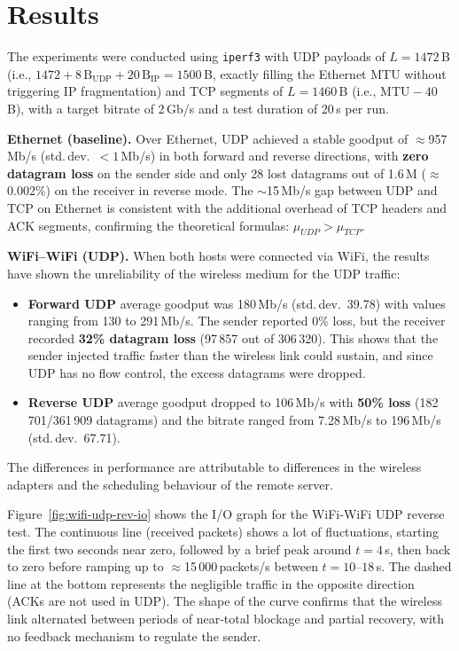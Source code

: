 \section{Results}

The experiments were conducted using \texttt{iperf3} with UDP payloads of $L=1472$\,B (i.e., $1472 + 8\,\text{B}_{\text{UDP}} + 20\,\text{B}_{\text{IP}} = 1500$\,B, exactly filling the Ethernet MTU without triggering IP fragmentation) and TCP segments of $L=1460$\,B (i.e., $\text{MTU} - 40$\,B), with a target bitrate of 2\,Gb/s and a test duration of 20\,s per run.

\textbf{Ethernet (baseline).}
Over Ethernet, UDP achieved a stable goodput of $\approx$957\,Mb/s (std.\,dev.\ $<1$\,Mb/s) in both forward and reverse directions, with \textbf{zero datagram loss} on the sender side and only 28 lost datagrams out of 1.6\,M ($\approx$0.002\%) on the receiver in reverse mode. The $\sim$15\,Mb/s gap between UDP and TCP on Ethernet is consistent with the additional overhead of TCP headers and ACK segments, confirming the theoretical formulas: $\mu_{UDP} > \mu_{TCP}$.

\textbf{WiFi--WiFi (UDP).}
When both hosts were connected via WiFi, the results have shown the unreliability of the wireless medium for the UDP traffic:
\begin{itemize}[noitemsep]
    \item \textbf{Forward UDP} average goodput was 180\,Mb/s (std.\,dev.\ 39.78) with values ranging from 130 to 291\,Mb/s. The sender reported 0\% loss, but the receiver recorded \textbf{32\% datagram loss} (97\,857 out of 306\,320). This shows that the sender injected traffic faster than the wireless link could sustain, and since UDP has no flow control, the excess datagrams were dropped.
    \item \textbf{Reverse UDP} average goodput dropped to 106\,Mb/s with \textbf{50\% loss} (182\,701/361\,909 datagrams) and the bitrate ranged from 7.28\,Mb/s to 196\,Mb/s (std.\,dev.\ 67.71). 
\end{itemize}
The differences in performance are attributable to differences in the wireless adapters and the scheduling behaviour of the remote server.

Figure~\ref{fig:wifi-udp-rev-io} shows the I/O graph for the WiFi-WiFi UDP reverse test. The continuous line (received packets) shows a lot of fluctuations, starting the first two seconds near zero, followed by a brief peak around $t=4$\,s, then back to zero before ramping up to $\approx$15\,000\,packets/s between $t=10$--$18$\,s. The dashed line at the bottom represents the negligible traffic in the opposite direction (ACKs are not used in UDP). The shape of the curve confirms that the wireless link alternated between periods of near-total blockage and partial recovery, with no feedback mechanism to regulate the sender.

